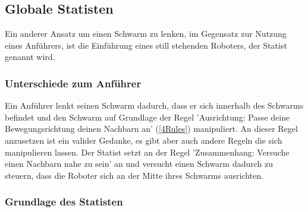 \subsection{Globale Statisten}

Ein anderer Ansatz um einen Schwarm zu lenken, im Gegensatz zur Nutzung eines Anführers, ist die Einführung eines still stehenden Roboters, der Statist genannt wird.

\subsubsection*{Unterschiede zum Anführer}

Ein Anführer lenkt seinen Schwarm dadurch, dass er sich innerhalb des Schwarms befindet und den Schwarm auf Grundlage der Regel 'Ausrichtung: Passe deine Bewegungsrichtung deinen Nachbarn an' (\autoref{4Rules}) manipuliert. An dieser Regel anzusetzen ist ein valider Gedanke, es gibt aber auch andere Regeln die sich manipulieren lassen. Der Statist setzt an der Regel 'Zusammenhang: Versuche einen Nachbarn nahe zu sein' an und versucht einen Schwarm dadurch zu steuern, dass die Roboter sich an der Mitte ihres Schwarms ausrichten.

\newpage
\subsubsection*{Grundlage des Statisten}

